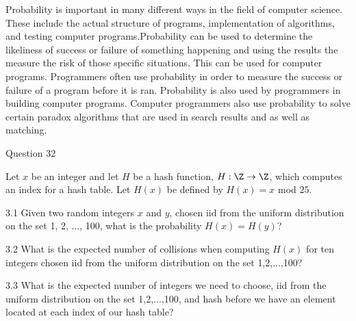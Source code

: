 \documentclass{article}
\begin{document}
\clearpage
\header
Probability is important in many different ways in the field of computer science.  These include the actual structure of programs, implementation of algorithms, and testing computer programs.Probability can be used to determine the likeliness of success or failure of something happening and using the results the measure the risk of those specific situations.  This can be used for computer programs.  Programmers often use probability in order to measure the success or failure of a program before it is ran.  Probability is also used by programmers in building computer programs.  Computer programmers also use probability to solve certain paradox algorithms that are used in search results and as well as matching.  


\clearpage
{} Question 32
\item[]

\clearpage
\header
Let $x$ be an integer and let $H$ be a hash function, $H: \Z \rightarrow \Z$, which computes an index for a hash table. Let $H(x)$ be defined by $H(x)=x$ mod $25$.
\item3.1 Given two random integers $x$ and $y$, chosen iid from the uniform distribution on the set {1, 2, ..., 100}, what is the probability $H(x)=H(y)$?
\item3.2 What is the expected number of collisions when computing $H(x)$ for ten integers chosen iid from the uniform distribution on the set {1,2,...,100}?
\item3.3 What is the expected number of integers we need to choose, iid from the uniform distribution on the set {1,2,...,100}, and hash before we have an element located at each index of our hash table?



\clearpage
\header


\clearpage
\header
\end{document}
